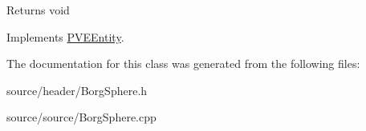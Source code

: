 \begin{DoxyReturn}{Returns}
void 
\end{DoxyReturn}


Implements \hyperlink{classPVEEntity}{PVEEntity}.



The documentation for this class was generated from the following files:\begin{DoxyCompactItemize}
\item 
source/header/BorgSphere.h\item 
source/source/BorgSphere.cpp\end{DoxyCompactItemize}
